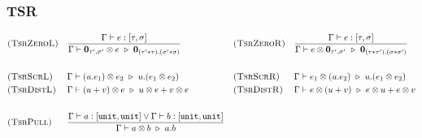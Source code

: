 \subsubsection*{\textsf{TSR}}
\begin{align*}
  & \textsc{(TsrZeroL)} && 
  \frac{\Gamma \vdash e : [\tau, \sigma]}{\Gamma \vdash \textbf{0}_{\tau', \sigma'} \otimes e \ \triangleright\  \textbf{0}_{(\tau' * \tau), (\sigma' * \sigma)}} 
  && \textsc{(TsrZeroR)} && 
  \frac{\Gamma \vdash e : [\tau, \sigma]}{\Gamma \vdash e \otimes \textbf{0}_{\tau', \sigma'} \ \triangleright\  \textbf{0}_{(\tau * \tau'), (\sigma * \sigma')}} \\
  \\
  & \textsc{(TsrScrL)} && \Gamma \vdash (u.e_1) \otimes e_2 \ \triangleright\  u.(e_1 \otimes e_2) 
  && \textsc{(TsrScrR)} && \Gamma \vdash e_1 \otimes (u.e_2) \ \triangleright\  u.(e_1 \otimes e_2)
  \\
  & \textsc{(TsrDistL)} && \Gamma \vdash (u + v) \otimes e \ \triangleright\  u \otimes e + v \otimes e
  && \textsc{(TsrDistR)} && \Gamma \vdash e \otimes (u + v) \ \triangleright\  e \otimes u + e \otimes v \\
  \\
  & \textsc{(TsrPull)} &&
  \frac{\Gamma \vdash a : [\texttt{unit}, \texttt{unit}] \vee \Gamma \vdash b : [\texttt{unit}, \texttt{unit}]}{\Gamma \vdash a \otimes b \ \triangleright\  a.b}
\end{align*}

